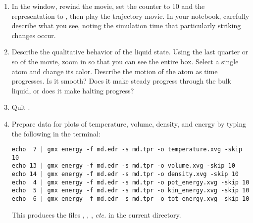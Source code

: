 \documentclass{article}
\begin{document}
\begin{enumerate}
  \item In the  window, rewind the movie, set the  counter to 10 and the representation to , then play the trajectory movie.
    In your notebook, carefully describe what you see, noting the simulation time that particularly striking changes occur.
  \item Describe the qualitative behavior of the liquid state.
    Using the last quarter or so of the movie, zoom in so that you can see the entire box.
    Select a single atom and change its color.
    Describe the motion of the atom as time progresses.
    Is it smooth?
    Does it make steady progress through the bulk liquid, or does it make halting progress?
  \item Quit .
  \item Prepare data for plots of temperature, volume, density, and energy by typing the following in the terminal:
\begin{Verbatim}
echo  7 | gmx energy -f md.edr -s md.tpr -o temperature.xvg -skip 10
echo 13 | gmx energy -f md.edr -s md.tpr -o volume.xvg -skip 10
echo 14 | gmx energy -f md.edr -s md.tpr -o density.xvg -skip 10
echo  4 | gmx energy -f md.edr -s md.tpr -o pot_energy.xvg -skip 10
echo  5 | gmx energy -f md.edr -s md.tpr -o kin_energy.xvg -skip 10
echo  6 | gmx energy -f md.edr -s md.tpr -o tot_energy.xvg -skip 10
\end{Verbatim}
    This produces the files , , , \emph{etc.} in the current directory.%

\end{enumerate}
\end{document}
